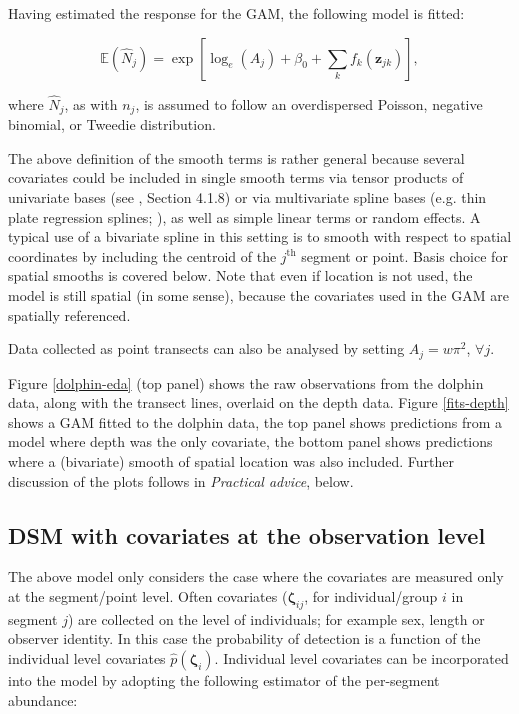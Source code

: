 \documentclass[a4paper,12pt]{article}
\begin{document}
Having estimated the response for the GAM, the following model is fitted:

\begin{equation}
\mathbb{E}(\hat{N}_j) = \exp\left[ \log_e \left( A_j \right) + \beta_0 + \sum_k f_k\left(\bm{z}_{jk}\right) \right],
\label{e:gamn}
\end{equation}

where $\hat{N}_j$, as with $n_j$, is assumed to follow an overdispersed Poisson, negative binomial, or Tweedie distribution.

The above definition of the smooth terms is rather general because several covariates could be included in single smooth terms via tensor products of univariate bases (see \cite{Wood:2006wz}, Section 4.1.8) or via multivariate spline bases (e.g. thin plate regression splines; \cite{Wood:2003tc}), as well as simple linear terms or random effects. A typical use of a bivariate spline in this setting is to smooth with respect to spatial coordinates by including the centroid of the $j^\text{th}$ segment or point. Basis choice for spatial smooths is covered below. Note that even if location is not used, the model is still spatial (in some sense), because the covariates used in the GAM are spatially referenced.

Data collected as point transects can also be analysed by setting $A_j=w\pi^2$, $\forall j$.

Figure \ref{dolphin-eda} (top panel) shows the raw observations from the dolphin data, along with the transect lines, overlaid on the depth data. Figure \ref{fits-depth} shows a GAM fitted to the dolphin data, the top panel shows predictions from a model where depth was the only covariate, the bottom panel shows predictions where a (bivariate) smooth of spatial location was also included. Further discussion of the plots follows in \textit{Practical advice}, below.

\subsection*{DSM with covariates at the observation level}

The above model only considers the case where the covariates are measured only at the segment/point level. Often covariates ($\bm{\zeta}_{ij}$, for individual/group $i$ in segment $j$) are collected on the level of individuals; for example sex, length or observer identity. In this case the probability of detection is a function of the individual level covariates $\hat{p}(\bm{\zeta}_i)$. Individual level covariates can be incorporated into the model by adopting the following estimator of the per-segment abundance:
\end{document}
